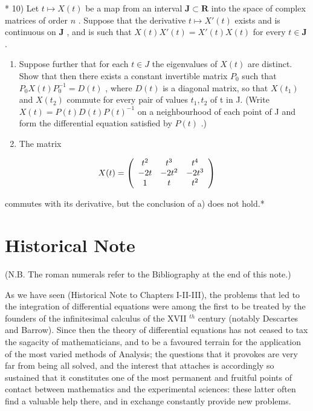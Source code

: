 * 10) Let \(t \mapsto X(t)\) be a map from an interval \(\mathbf{J} \subset \mathbf{R}\) into the space of complex matrices of order \(n\) . Suppose that the derivative \(t \mapsto X'(t)\) exists and is continuous on \(\mathbf{J}\) , and is such that \(X(t)X'(t) = X'(t)X(t)\) for every \(t \in \mathbf{J}\) .

\begin{enumerate}
\def\labelenumi{\alph{enumi})}
\item
  Suppose further that for each \(t \in J\) the eigenvalues of \(X(t)\) are distinct. Show that then there exists a constant invertible matrix \(P_{0}\) such that \(P_{0}X(t)P_{0}^{-1} = D(t)\) , where \(D(t)\) is a diagonal matrix, so that \(X(t_{1})\) and \(X(t_{2})\) commute for every pair of values \(t_{1}, t_{2}\) of t in J. (Write \(X(t) = P(t)D(t)P(t)^{-1}\) on a neighbourhood of each point of J and form the differential equation satisfied by \(P(t)\) .)
\item
  The matrix
\end{enumerate}

\[
X (t) = \left( \begin{array}{c c c} t ^ {2} & t ^ {3} & t ^ {4} \\ - 2 t & - 2 t ^ {2} & - 2 t ^ {3} \\ 1 & t & t ^ {2} \end{array} \right)
\]

commutes with its derivative, but the conclusion of a) does not hold.*

\section*{Historical Note}
{}

(N.B. The roman numerals refer to the Bibliography at the end of this note.)

As we have seen (Historical Note to Chapters I-II-III), the problems that led to the integration of differential equations were among the first to be treated by the founders of the infinitesimal calculus of the XVII \(^{th}\) century (notably Descartes and Barrow). Since then the theory of differential equations has not ceased to tax the sagacity of mathematicians, and to be a favoured terrain for the application of the most varied methods of Analysis; the questions that it provokes are very far from being all solved, and the interest that attaches is accordingly so sustained that it constitutes one of the most permanent and fruitful points of contact between mathematics and the experimental sciences: these latter often find a valuable help there, and in exchange constantly provide new problems.

